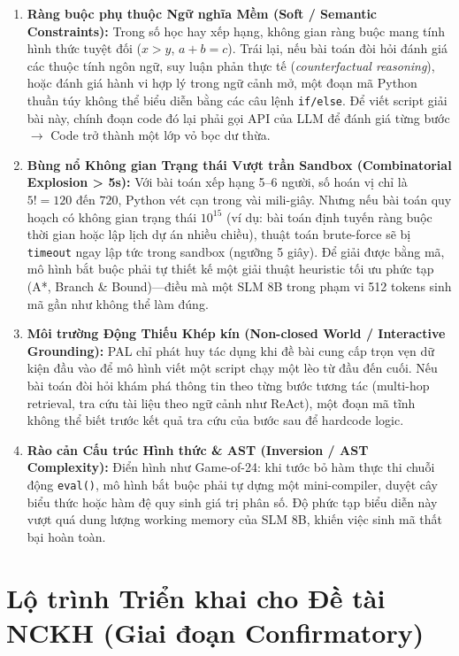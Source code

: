 \documentclass[11pt,a4paper]{report}
\begin{document}
\begin{enumerate}[leftmargin=*]
    \item \textbf{Ràng buộc phụ thuộc Ngữ nghĩa Mềm (Soft / Semantic Constraints):}  
    Trong số học hay xếp hạng, không gian ràng buộc mang tính hình thức tuyệt đối ($x > y$, $a + b = c$). Trái lại, nếu bài toán đòi hỏi đánh giá các thuộc tính ngôn ngữ, suy luận phản thực tế (\textit{counterfactual reasoning}), hoặc đánh giá hành vi hợp lý trong ngữ cảnh mở, một đoạn mã Python thuần túy không thể biểu diễn bằng các câu lệnh \texttt{if/else}. Để viết script giải bài này, chính đoạn code đó lại phải gọi API của LLM để đánh giá từng bước $\to$ Code trở thành một lớp vỏ bọc dư thừa.

    \item \textbf{Bùng nổ Không gian Trạng thái Vượt trần Sandbox (Combinatorial Explosion > 5s):}  
    Với bài toán xếp hạng 5--6 người, số hoán vị chỉ là $5! = 120$ đến $720$, Python vét cạn trong vài mili-giây. Nhưng nếu bài toán quy hoạch có không gian trạng thái $10^{15}$ (ví dụ: bài toán định tuyến ràng buộc thời gian hoặc lập lịch dự án nhiều chiều), thuật toán brute-force sẽ bị \texttt{timeout} ngay lập tức trong sandbox (ngưỡng 5 giây). Để giải được bằng mã, mô hình bắt buộc phải tự thiết kế một giải thuật heuristic tối ưu phức tạp (A*, Branch \& Bound)—điều mà một SLM 8B trong phạm vi 512 tokens sinh mã gần như không thể làm đúng.

    \item \textbf{Môi trường Động Thiếu Khép kín (Non-closed World / Interactive Grounding):}  
    PAL chỉ phát huy tác dụng khi đề bài cung cấp trọn vẹn dữ kiện đầu vào để mô hình viết một script chạy một lèo từ đầu đến cuối. Nếu bài toán đòi hỏi khám phá thông tin theo từng bước tương tác (multi-hop retrieval, tra cứu tài liệu theo ngữ cảnh như ReAct), một đoạn mã tĩnh không thể biết trước kết quả tra cứu của bước sau để hardcode logic.

    \item \textbf{Rào cản Cấu trúc Hình thức \& AST (Inversion / AST Complexity):}  
    Điển hình như Game-of-24: khi tước bỏ hàm thực thi chuỗi động \texttt{eval()}, mô hình bắt buộc phải tự dựng một mini-compiler, duyệt cây biểu thức hoặc hàm đệ quy sinh giá trị phân số. Độ phức tạp biểu diễn này vượt quá dung lượng working memory của SLM 8B, khiến việc sinh mã thất bại hoàn toàn.
\end{enumerate}

\section{Lộ trình Triển khai cho Đề tài NCKH (Giai đoạn Confirmatory)}
\end{document}
